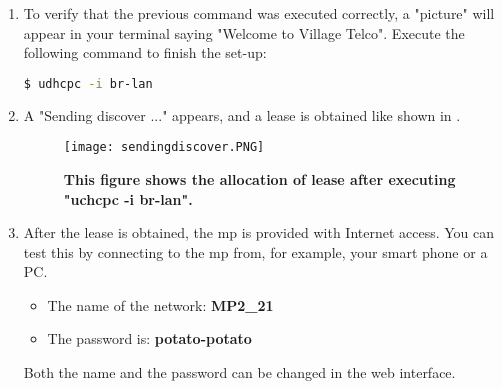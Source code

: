 \begin{enumerate}
\item To verify that the previous command was executed correctly, a "picture" will appear in your terminal saying "Welcome to Village Telco". Execute the following command to finish the set-up:
\noindent
\begin{lstlisting}[language=bash]
 $ udhcpc -i br-lan
\end{lstlisting}
\item A "Sending discover ..." appears, and a lease is obtained like shown in . 
\begin{figure}[h!]
  \centering
      \texttt{[image: sendingdiscover.PNG]}
  \caption [The results from executing "uchcpc -i br-lan".]{\textbf{This figure shows the allocation of lease after executing "uchcpc -i br-lan".}}
  \label{fig:sendingdiscover}
\end{figure}
\item After the lease is obtained, the \gls{mp} is provided with Internet access. You can test this by connecting to the \gls{mp} from, for example, your smart phone or a PC. 
\begin{itemize}
\item The name of the network: \textbf{MP2_21}
\item The password is: \textbf{potato-potato}
\end{itemize}
Both the name and the password can be changed in the web interface. 
\end{enumerate}
